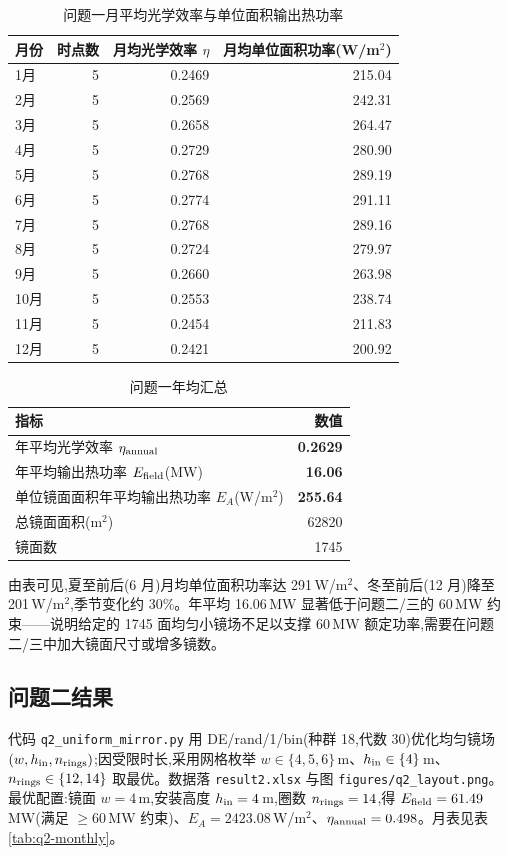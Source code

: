 \documentclass[UTF8,a4paper,12pt]{ctexart}
\begin{document}
\begin{table}[H]
  \centering
  \caption{问题一月平均光学效率与单位面积输出热功率}
  \label{tab:q1-monthly}
  \begin{tabular}{lrrr}
    \toprule
    月份 & 时点数 & 月均光学效率 $\eta$ & 月均单位面积功率(W/m$^2$) \\
    \midrule
    1月 & 5 & 0.2469 & 215.04 \\
    2月 & 5 & 0.2569 & 242.31 \\
    3月 & 5 & 0.2658 & 264.47 \\
    4月 & 5 & 0.2729 & 280.90 \\
    5月 & 5 & 0.2768 & 289.19 \\
    6月 & 5 & 0.2774 & 291.11 \\
    7月 & 5 & 0.2768 & 289.16 \\
    8月 & 5 & 0.2724 & 279.97 \\
    9月 & 5 & 0.2660 & 263.98 \\
    10月 & 5 & 0.2553 & 238.74 \\
    11月 & 5 & 0.2454 & 211.83 \\
    12月 & 5 & 0.2421 & 200.92 \\
    \bottomrule
  \end{tabular}
\end{table}

\begin{table}[H]
  \centering
  \caption{问题一年均汇总}
  \label{tab:q1-annual}
  \begin{tabular}{lr}
    \toprule
    指标 & 数值 \\
    \midrule
    年平均光学效率 $\eta_{\rm annual}$ & \textbf{0.2629} \\
    年平均输出热功率 $E_{\rm field}$(MW) & \textbf{16.06} \\
    单位镜面面积年平均输出热功率 $E_A$(W/m$^2$) & \textbf{255.64} \\
    总镜面面积(m$^2$) & 62820 \\
    镜面数 & 1745 \\
    \bottomrule
  \end{tabular}
\end{table}

由表可见,夏至前后(6 月)月均单位面积功率达 291\,W/m$^2$、冬至前后(12 月)降至 201\,W/m$^2$,季节变化约 30\%。年平均 16.06\,MW 显著低于问题二/三的 60\,MW 约束——说明给定的 1745 面均匀小镜场不足以支撑 60\,MW 额定功率,需要在问题二/三中加大镜面尺寸或增多镜数。

\subsection{问题二结果}
代码 \texttt{q2\_uniform\_mirror.py} 用 DE/rand/1/bin(种群 18,代数 30)优化均匀镜场 $(w, h_{\rm in}, n_{\rm rings})$;因受限时长,采用网格枚举 $w\in\{4,5,6\}$\,m、$h_{\rm in}\in\{4\}$\,m、$n_{\rm rings}\in\{12,14\}$ 取最优。数据落 \texttt{result2.xlsx} 与图 \texttt{figures/q2\_layout.png}。最优配置:镜面 $w=4$\,m,安装高度 $h_{\rm in}=4$\,m,圈数 $n_{\rm rings}=14$,得 $E_{\rm field}=61.49$\,MW(满足 $\ge 60$\,MW 约束)、$E_A=2423.08$\,W/m$^2$、$\eta_{\rm annual}=0.498$。月表见表 \ref{tab:q2-monthly}。
\end{document}
